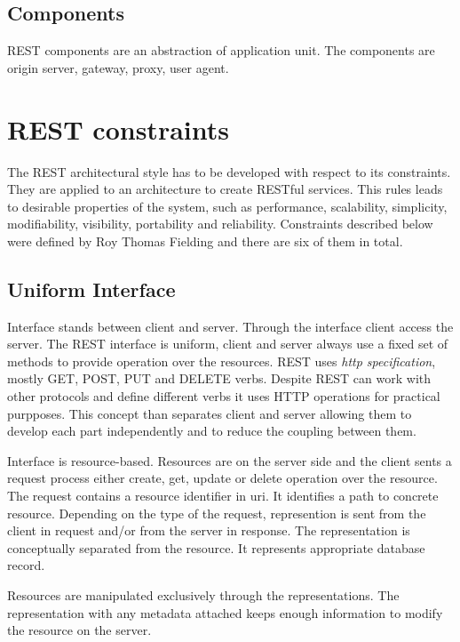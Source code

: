 \subsection{Components}
REST components are an abstraction of application unit. The components are origin server, gateway, proxy, user agent. %

\section{REST constraints}
\label{sec:constraints}

The REST architectural style has to be developed with respect to its constraints. They are applied to an architecture to create RESTful services. This rules leads to desirable properties of the system, such as performance, scalability, simplicity, modifiability, visibility, portability and reliability. Constraints described below were defined by Roy Thomas Fielding and there are six of them in total.

\subsection{Uniform Interface}
  
Interface stands between client and server. Through the interface client access the server. The REST interface is uniform, client and server always use a fixed set of methods to provide operation over the resources. REST uses \emph{\gls{http} specification}, mostly GET, POST, PUT and DELETE verbs. Despite REST can work with other protocols and define different verbs it uses HTTP operations for practical purpposes. This concept than separates client and server allowing them to develop each part independently and to reduce the coupling between them. 

Interface is resource-based. Resources are on the server side and the client sents a request process either create, get, update or delete operation over the resource. The request contains a resource identifier in \gls{uri}. It identifies a path to concrete resource. Depending on the type of the request, represention is sent from the client in request and/or from the server in response. The representation is conceptually separated from the resource. It represents appropriate database record.

Resources are manipulated exclusively through the representations. The representation with any metadata attached keeps enough information to modify the resource on the server.

